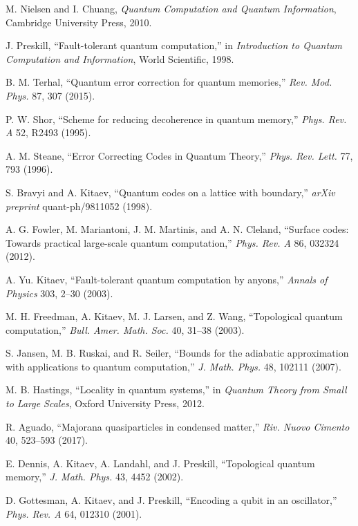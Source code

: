 \documentclass[11pt]{article}
\begin{document}

\begin{thebibliography}{99}

M. Nielsen and I. Chuang, 
\newblock \emph{Quantum Computation and Quantum Information},
\newblock Cambridge University Press, 2010.

J. Preskill,
\newblock ``Fault-tolerant quantum computation,''
\newblock in \emph{Introduction to Quantum Computation and Information},
\newblock World Scientific, 1998.

B. M. Terhal,
\newblock ``Quantum error correction for quantum memories,''
\newblock \emph{Rev. Mod. Phys.} 87, 307 (2015).

P. W. Shor,
\newblock ``Scheme for reducing decoherence in quantum memory,''
\newblock \emph{Phys. Rev. A} 52, R2493 (1995).

A. M. Steane,
\newblock ``Error Correcting Codes in Quantum Theory,''
\newblock \emph{Phys. Rev. Lett.} 77, 793 (1996).

S. Bravyi and A. Kitaev,
\newblock ``Quantum codes on a lattice with boundary,''
\newblock \emph{arXiv preprint} quant-ph/9811052 (1998).

A. G. Fowler, M. Mariantoni, J. M. Martinis, and A. N. Cleland,
\newblock ``Surface codes: Towards practical large-scale quantum computation,''
\newblock \emph{Phys. Rev. A} 86, 032324 (2012).

A. Yu. Kitaev,
\newblock ``Fault-tolerant quantum computation by anyons,''
\newblock \emph{Annals of Physics} 303, 2--30 (2003).

M. H. Freedman, A. Kitaev, M. J. Larsen, and Z. Wang,
\newblock ``Topological quantum computation,''
\newblock \emph{Bull. Amer. Math. Soc.} 40, 31--38 (2003).

S. Jansen, M. B. Ruskai, and R. Seiler,
\newblock ``Bounds for the adiabatic approximation with applications to quantum computation,''
\newblock \emph{J. Math. Phys.} 48, 102111 (2007).

M. B. Hastings,
\newblock ``Locality in quantum systems,''
\newblock in \emph{Quantum Theory from Small to Large Scales}, 
\newblock Oxford University Press, 2012.

R. Aguado,
\newblock ``Majorana quasiparticles in condensed matter,''
\newblock \emph{Riv. Nuovo Cimento} 40, 523--593 (2017).

E. Dennis, A. Kitaev, A. Landahl, and J. Preskill,
\newblock ``Topological quantum memory,''
\newblock \emph{J. Math. Phys.} 43, 4452 (2002).

D. Gottesman, A. Kitaev, and J. Preskill,
\newblock ``Encoding a qubit in an oscillator,''
\newblock \emph{Phys. Rev. A} 64, 012310 (2001).

\end{thebibliography}
\end{document}
